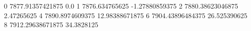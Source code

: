 0 7877.91357421875 0.0
1 7876.634765625 -1.27880859375
2 7880.38623046875 2.47265625
4 7890.8974609375 12.98388671875
6 7904.43896484375 26.525390625
8 7912.29638671875 34.3828125
